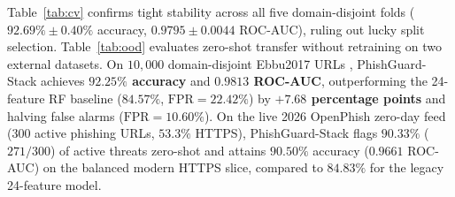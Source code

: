 \documentclass[conference]{IEEEtran}
\begin{document}
\begin{table}[t]
\caption{5-Fold Registrable-Domain-Disjoint Cross-Validation \& Bootstrap 95\% CIs}
\label{tab:cv}
\centering
\scriptsize
\renewcommand{\arraystretch}{1.12}
\end{table}

Table~\ref{tab:cv} confirms tight stability across all five domain-disjoint folds ($92.69\% \pm 0.40\%$ accuracy, $0.9795 \pm 0.0044$ ROC-AUC), ruling out lucky split selection. Table~\ref{tab:ood} evaluates zero-shot transfer without retraining on two external datasets. On $10{,}000$ domain-disjoint Ebbu2017 URLs \cite{sahingoz2019}, PhishGuard-Stack achieves \textbf{$92.25\%$ accuracy} and \textbf{$0.9813$ ROC-AUC}, outperforming the 24-feature RF baseline ($84.57\%$, $\text{FPR}=22.42\%$) by \textbf{$+7.68$ percentage points} and halving false alarms ($\text{FPR}=10.60\%$). On the live 2026 OpenPhish zero-day feed ($300$ active phishing URLs, $53.3\%$ HTTPS), PhishGuard-Stack flags \textbf{$90.33\%$} ($271/300$) of active threats zero-shot and attains $90.50\%$ accuracy ($0.9661$ ROC-AUC) on the balanced modern HTTPS slice, compared to $84.83\%$ for the legacy 24-feature model.
\end{document}
